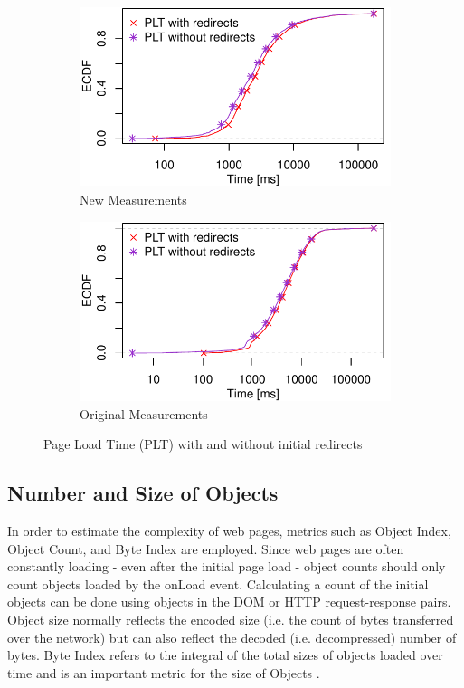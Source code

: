 \begin{figure}
 \centering
 \begin{subfigure}{\linewidth}
		\includegraphics[width=\linewidth]{New_Plots/ecdf_loadtimes.pdf}
	\caption{New Measurements}
	\label{fig:new_plot_redirects}
\end{subfigure}\par\medskip
\begin{subfigure}{\linewidth}
		\includegraphics[width=\linewidth]{Original Plots/ecdf_loadtimes.pdf}
	\caption{Original Measurements}
	\label{fig:orig_plot_redirects}
\end{subfigure}
\caption{Page Load Time (PLT) with and without initial redirects}
\label{fig:plot_redirects}
\end{figure}

\subsection{Number and Size of Objects}
In order to estimate the complexity of web pages, metrics such as Object Index, Object Count, and Byte Index are employed. Since web pages are often constantly loading - even after the initial page load - object counts should only count objects loaded by the onLoad event. Calculating a count of the initial objects can be done using objects in the DOM or HTTP request-response pairs. Object size normally reflects the encoded size (i.e. the count of bytes transferred over the network) but can also reflect the decoded (i.e. decompressed) number of bytes. Byte Index refers to the integral of the total sizes of objects loaded over time and is an important metric for the size of Objects \cite{10.1145/2940136.2940138}.


